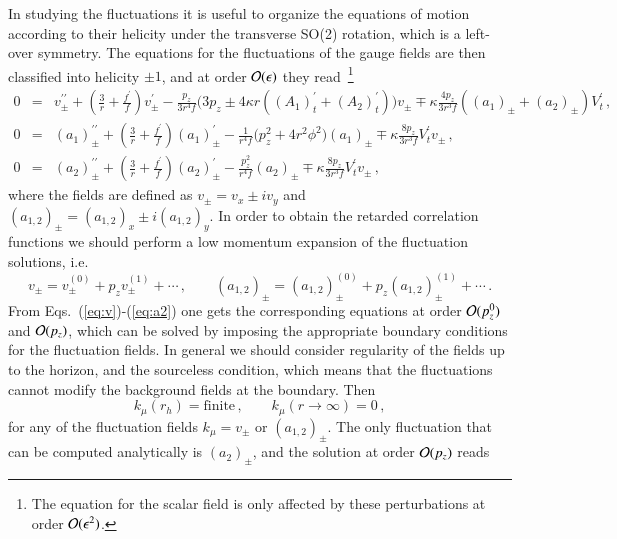 \documentclass[epj]{webofc}
\begin{document}
In studying the fluctuations it is useful to organize the equations of motion according to their helicity under the transverse SO(2) rotation, which is a left-over symmetry. The equations for the fluctuations of the gauge fields are then classified into helicity $\pm 1$, and at order ${\cal O}(\epsilon)$ they read~\footnote{The equation for the scalar field is only affected by these perturbations at order ${\cal O}(\epsilon^2)$.}
\begin{eqnarray}
0 &=& v_{\pm}^{\prime\prime} + \left( \frac{3}{r} + \frac{f^\prime}{f} \right) v_\pm^\prime - \frac{p_z}{3r^4f} \big( 3p_z \pm 4\kappa r \left( (A_1)_t^\prime + (A_2)_t^\prime \right) \big) v_\pm  \mp \kappa \frac{4p_z}{3r^3f} \left( (a_1)_\pm + (a_2)_\pm \right) V_t^\prime   \,,  \label{eq:v} \\
0 &=& (a_1)_{\pm}^{\prime\prime} + \left( \frac{3}{r} + \frac{f^\prime}{f} \right) (a_1)_\pm^\prime - \frac{1}{r^4f} \big( p_z^2 + 4 r^2\phi^2 \big) (a_1)_\pm  \mp \kappa \frac{8p_z}{3r^3f} V_t^\prime v_\pm \,, \label{eq:a1} \\
0 &=& (a_2)_{\pm}^{\prime\prime} + \left( \frac{3}{r} + \frac{f^\prime}{f} \right) (a_2)_\pm^\prime - \frac{p_z^2}{r^4f} (a_2)_\pm  \mp \kappa \frac{8p_z}{3r^3f} V_t^\prime v_\pm   \,, \label{eq:a2}
\end{eqnarray}
where the fields are defined as  $v_\pm = v_x \pm i v_y$ and $(a_{1,2})_\pm = (a_{1,2})_x \pm i (a_{1,2})_y$. In order to obtain the retarded correlation functions we should perform a low momentum expansion of the fluctuation solutions, i.e.
\begin{equation}
v_\pm = v^{(0)}_\pm + p_z v^{(1)}_\pm + \cdots  \,, \qquad (a_{1,2})_\pm = (a_{1,2})^{(0)}_\pm + p_z (a_{1,2})^{(1)}_\pm + \cdots  \,.
\end{equation}
From Eqs.~(\ref{eq:v})-(\ref{eq:a2}) one gets the corresponding equations at order ${\cal O}(p_z^0)$ and  ${\cal O}(p_z)$, which can be solved by imposing the appropriate boundary conditions for the fluctuation fields. In general we should consider regularity of the fields up to the horizon, and the sourceless condition, which means that the fluctuations cannot modify the background fields at the boundary. Then
\begin{equation}
k_\mu(r_h) = \textrm{finite} \,, \qquad k_\mu(r \to \infty ) = 0 \,,  
\end{equation}
for any of the fluctuation fields $k_\mu = v_\pm$ or $(a_{1,2})_{\pm}$. The only fluctuation that can be computed analytically is $(a_2)_{\pm}$, and the solution at order ${\cal O}(p_z)$ reads
\end{document}
